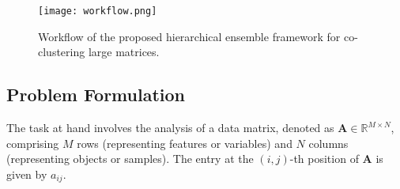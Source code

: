 \begin{figure*}[htbp]
    \centering
    \texttt{[image: workflow.png]}
    \caption{Workflow of the proposed hierarchical ensemble framework for co-clustering large matrices.}
    \label{fig:workflow}
\end{figure*}




\subsection{Problem Formulation}
The task at hand involves the analysis of a data matrix, denoted as $\mathbf{A} \in \mathbb{R}^{M \times N}$, comprising $M$ rows (representing features or variables) and $N$ columns (representing objects or samples). The entry at the $(i, j)$-th position of $\mathbf{A}$ is given by $a_{ij}$.

